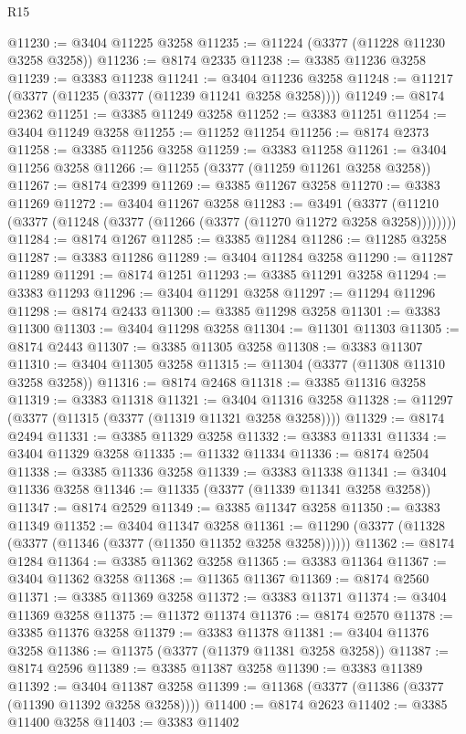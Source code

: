 \begin{lexlean}{R15}
\begin{coremodule}
@11230 := @3404 @11225 @3258
@11235 := @11224 (@3377 (@11228 @11230 @3258 @3258))
@11236 := @8174 @2335
@11238 := @3385 @11236 @3258
@11239 := @3383 @11238
@11241 := @3404 @11236 @3258
@11248 := @11217 (@3377 (@11235 (@3377 (@11239 @11241 @3258 @3258))))
@11249 := @8174 @2362
@11251 := @3385 @11249 @3258
@11252 := @3383 @11251
@11254 := @3404 @11249 @3258
@11255 := @11252 @11254
@11256 := @8174 @2373
@11258 := @3385 @11256 @3258
@11259 := @3383 @11258
@11261 := @3404 @11256 @3258
@11266 := @11255 (@3377 (@11259 @11261 @3258 @3258))
@11267 := @8174 @2399
@11269 := @3385 @11267 @3258
@11270 := @3383 @11269
@11272 := @3404 @11267 @3258
@11283 := @3491
    (@3377 (@11210 (@3377 (@11248 (@3377 (@11266 (@3377 (@11270 @11272 @3258 @3258))))))))
@11284 := @8174 @1267
@11285 := @3385 @11284
@11286 := @11285 @3258
@11287 := @3383 @11286
@11289 := @3404 @11284 @3258
@11290 := @11287 @11289
@11291 := @8174 @1251
@11293 := @3385 @11291 @3258
@11294 := @3383 @11293
@11296 := @3404 @11291 @3258
@11297 := @11294 @11296
@11298 := @8174 @2433
@11300 := @3385 @11298 @3258
@11301 := @3383 @11300
@11303 := @3404 @11298 @3258
@11304 := @11301 @11303
@11305 := @8174 @2443
@11307 := @3385 @11305 @3258
@11308 := @3383 @11307
@11310 := @3404 @11305 @3258
@11315 := @11304 (@3377 (@11308 @11310 @3258 @3258))
@11316 := @8174 @2468
@11318 := @3385 @11316 @3258
@11319 := @3383 @11318
@11321 := @3404 @11316 @3258
@11328 := @11297 (@3377 (@11315 (@3377 (@11319 @11321 @3258 @3258))))
@11329 := @8174 @2494
@11331 := @3385 @11329 @3258
@11332 := @3383 @11331
@11334 := @3404 @11329 @3258
@11335 := @11332 @11334
@11336 := @8174 @2504
@11338 := @3385 @11336 @3258
@11339 := @3383 @11338
@11341 := @3404 @11336 @3258
@11346 := @11335 (@3377 (@11339 @11341 @3258 @3258))
@11347 := @8174 @2529
@11349 := @3385 @11347 @3258
@11350 := @3383 @11349
@11352 := @3404 @11347 @3258
@11361 := @11290 (@3377 (@11328 (@3377 (@11346 (@3377 (@11350 @11352 @3258 @3258))))))
@11362 := @8174 @1284
@11364 := @3385 @11362 @3258
@11365 := @3383 @11364
@11367 := @3404 @11362 @3258
@11368 := @11365 @11367
@11369 := @8174 @2560
@11371 := @3385 @11369 @3258
@11372 := @3383 @11371
@11374 := @3404 @11369 @3258
@11375 := @11372 @11374
@11376 := @8174 @2570
@11378 := @3385 @11376 @3258
@11379 := @3383 @11378
@11381 := @3404 @11376 @3258
@11386 := @11375 (@3377 (@11379 @11381 @3258 @3258))
@11387 := @8174 @2596
@11389 := @3385 @11387 @3258
@11390 := @3383 @11389
@11392 := @3404 @11387 @3258
@11399 := @11368 (@3377 (@11386 (@3377 (@11390 @11392 @3258 @3258))))
@11400 := @8174 @2623
@11402 := @3385 @11400 @3258
@11403 := @3383 @11402

\end{coremodule}
\end{lexlean}
